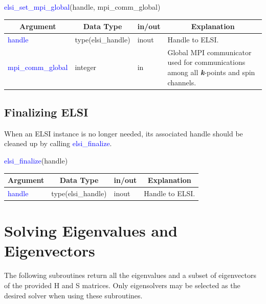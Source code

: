 \documentclass{report}
\begin{document}
\bigskip
\begin{labeling}{\hspace{6cm}}
\item [\hspace{0.3cm} \textcolor{blue}{elsi\_set\_mpi\_global}(handle, mpi\_comm\_global)]
\end{labeling}

\begin{tabular}[]{|p{30mm}|p{30mm}|p{15mm}|p{90mm}|}
\hline
\multicolumn{1}{|c|}{\textbf{Argument}} & \multicolumn{1}{c|}{\textbf{Data Type}} & \multicolumn{1}{c|}{\textbf{in/out}} & \multicolumn{1}{c|}{\textbf{Explanation}}\\
\hline
\textcolor{blue}{handle}            & type(elsi\_handle) & inout & Handle to ELSI.\\
\hline
\textcolor{blue}{mpi\_comm\_global} & integer            & in    & Global MPI communicator used for communications among all \textbf{\textit{k}}-points and spin channels.\\
\hline
\end{tabular}

\subsection{Finalizing ELSI}
\label{subsec:setup_final}
When an ELSI instance is no longer needed, its associated handle should be cleaned up by calling \textcolor{blue}{elsi\_finalize}.\\

\begin{labeling}{\hspace{6cm}}
\item [\hspace{0.3cm} \textcolor{blue}{elsi\_finalize}(handle)]
\end{labeling}

\begin{tabular}[]{|p{30mm}|p{30mm}|p{15mm}|p{90mm}|}
\hline
\multicolumn{1}{|c|}{\textbf{Argument}} & \multicolumn{1}{c|}{\textbf{Data Type}} & \multicolumn{1}{c|}{\textbf{in/out}} & \multicolumn{1}{c|}{\textbf{Explanation}}\\
\hline
\textcolor{blue}{handle} & type(elsi\_handle) & inout & Handle to ELSI.\\
\hline
\end{tabular}

\section{Solving Eigenvalues and Eigenvectors}
\label{sec:ev}
The following subroutines return all the eigenvalues and a subset of eigenvectors of the provided H and S matrices.  Only eigensolvers may be selected as the desired solver when using these subroutines.\\
\end{document}
